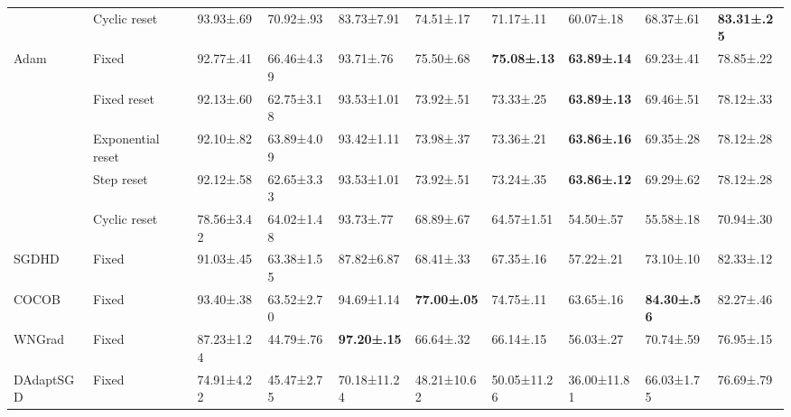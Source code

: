 \begin{tabular}{llllllllll}
                             & Cyclic reset      & 93.93±.69           & 70.92±.93            & 83.73±7.91          & 74.51±.17           & 71.17±.11           & 60.07±.18           & 68.37±.61           & \bfseries 83.31±.25 \\
    \multirow[c]{5}{*}{Adam} & Fixed             & 92.77±.41           & 66.46±4.39           & 93.71±.76           & 75.50±.68           & \bfseries 75.08±.13 & \bfseries 63.89±.14 & 69.23±.41           & 78.85±.22           \\
                             & Fixed reset       & 92.13±.60           & 62.75±3.18           & 93.53±1.01          & 73.92±.51           & 73.33±.25           & \bfseries 63.89±.13 & 69.46±.51           & 78.12±.33           \\
                             & Exponential reset & 92.10±.82           & 63.89±4.09           & 93.42±1.11          & 73.98±.37           & 73.36±.21           & \bfseries 63.86±.16 & 69.35±.28           & 78.12±.28           \\
                             & Step reset        & 92.12±.58           & 62.65±3.33           & 93.53±1.01          & 73.92±.51           & 73.24±.35           & \bfseries 63.86±.12 & 69.29±.62           & 78.12±.28           \\
                             & Cyclic reset      & 78.56±3.42          & 64.02±1.48           & 93.73±.77           & 68.89±.67           & 64.57±1.51          & 54.50±.57           & 55.58±.18           & 70.94±.30           \\
    SGDHD                    & Fixed             & 91.03±.45           & 63.38±1.55           & 87.82±6.87          & 68.41±.33           & 67.35±.16           & 57.22±.21           & 73.10±.10           & 82.33±.12           \\
    COCOB                    & Fixed             & 93.40±.38           & 63.52±2.70           & 94.69±1.14          & \bfseries 77.00±.05 & 74.75±.11           & 63.65±.16           & \bfseries 84.30±.56 & 82.27±.46           \\
    WNGrad                   & Fixed             & 87.23±1.24          & 44.79±.76            & \bfseries 97.20±.15 & 66.64±.32           & 66.14±.15           & 56.03±.27           & 70.74±.59           & 76.95±.15           \\
    DAdaptSGD                & Fixed             & 74.91±4.22          & 45.47±2.75           & 70.18±11.24         & 48.21±10.62         & 50.05±11.26         & 36.00±11.81         & 66.03±1.75          & 76.69±.79           \\

\end{tabular}
